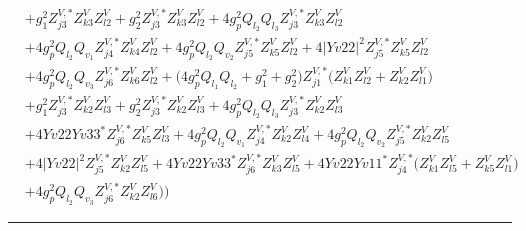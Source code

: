 \begin{align}
 &+g_{1}^{2} Z^{V,*}_{j 3} Z_{{k 3}}^{V} Z_{{l 2}}^{V} +g_{2}^{2} Z^{V,*}_{j 3} Z_{{k 3}}^{V} Z_{{l 2}}^{V} +4 g_{p}^{2} Q_{l_2} Q_{l_3} Z^{V,*}_{j 3} Z_{{k 3}}^{V} Z_{{l 2}}^{V} \nonumber \\ 
 &+4 g_{p}^{2} Q_{l_2} Q_{v_1} Z^{V,*}_{j 4} Z_{{k 4}}^{V} Z_{{l 2}}^{V} +4 g_{p}^{2} Q_{l_2} Q_{v_2} Z^{V,*}_{j 5} Z_{{k 5}}^{V} Z_{{l 2}}^{V} +4 |Yv22|^2 Z^{V,*}_{j 5} Z_{{k 5}}^{V} Z_{{l 2}}^{V} \nonumber \\ 
 &+4 g_{p}^{2} Q_{l_2} Q_{v_3} Z^{V,*}_{j 6} Z_{{k 6}}^{V} Z_{{l 2}}^{V} +\Big(4 g_{p}^{2} Q_{l_1} Q_{l_2}  + g_{1}^{2} + g_{2}^{2}\Big)Z^{V,*}_{j 1} \Big(Z_{{k 1}}^{V} Z_{{l 2}}^{V}  + Z_{{k 2}}^{V} Z_{{l 1}}^{V} \Big)\nonumber \\ 
 &+g_{1}^{2} Z^{V,*}_{j 3} Z_{{k 2}}^{V} Z_{{l 3}}^{V} +g_{2}^{2} Z^{V,*}_{j 3} Z_{{k 2}}^{V} Z_{{l 3}}^{V} +4 g_{p}^{2} Q_{l_2} Q_{l_3} Z^{V,*}_{j 3} Z_{{k 2}}^{V} Z_{{l 3}}^{V} \nonumber \\ 
 &+4 Yv22 Yv33^* Z^{V,*}_{j 6} Z_{{k 5}}^{V} Z_{{l 3}}^{V} +4 g_{p}^{2} Q_{l_2} Q_{v_1} Z^{V,*}_{j 4} Z_{{k 2}}^{V} Z_{{l 4}}^{V} +4 g_{p}^{2} Q_{l_2} Q_{v_2} Z^{V,*}_{j 5} Z_{{k 2}}^{V} Z_{{l 5}}^{V} \nonumber \\ 
 &+4 |Yv22|^2 Z^{V,*}_{j 5} Z_{{k 2}}^{V} Z_{{l 5}}^{V} +4 Yv22 Yv33^* Z^{V,*}_{j 6} Z_{{k 3}}^{V} Z_{{l 5}}^{V} +4 Yv22 Yv11^* Z^{V,*}_{j 4} \Big(Z_{{k 1}}^{V} Z_{{l 5}}^{V}  + Z_{{k 5}}^{V} Z_{{l 1}}^{V} \Big)\nonumber \\ 
 &+4 g_{p}^{2} Q_{l_2} Q_{v_3} Z^{V,*}_{j 6} Z_{{k 2}}^{V} Z_{{l 6}}^{V} \Big)\Big)\end{align} 
\hrule 
